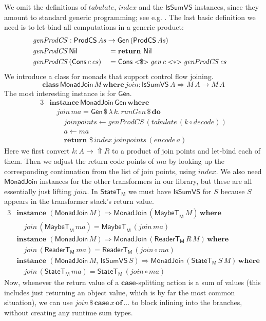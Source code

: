 \documentclass[acmsmall,screen,review,anonymous]{acmart}
\newcommand{\mit}[1]{\mathit{#1}}
\newcommand{\msf}[1]{\mathsf{#1}}
\newcommand{\mbf}[1]{\mathbf{#1}}
\newcommand{\mdo}{\mbf{do}\,}
\newcommand{\ind}{\hspace{1em}}
\newcommand{\return}{\mbf{return}\,}
\newcommand{\lam}{\lambda\,}
\newcommand{\where}{\mbf{where}}
\newcommand{\M}{\msf{M}}
\newcommand{\of}{\mbf{of}\,}
\newcommand{\vma}{\mit{ma}}
\newcommand{\Nil}{\msf{Nil}}
\newcommand{\Cons}{\msf{Cons}}
\newcommand{\ReaderT}{\msf{ReaderT}}
\newcommand{\fro}{\leftarrow}
\newcommand{\case}{\mbf{case\,}}
\newcommand{\Lift}{{\Uparrow}}
\newcommand{\MaybeT}{\msf{MaybeT}}
\theoremstyle{remark}
\newcommand{\tyclass}{\mbf{class}}
\newcommand{\instance}{\mbf{instance}\,}
\newcommand{\Gen}{\msf{Gen}}
\newcommand{\gen}{\mit{gen}}
\newcommand{\fmap}{<\!\!\$\!\!>}
\newcommand{\ap}{<\!\!*\!\!>}
\newcommand{\runGen}{\mit{runGen}}
\newcommand{\RA}{\Rightarrow}
\newcommand{\StateT}{\msf{StateT}}
\newcommand{\dlr}{\,\$\,}
\newcommand{\ProdCS}{\msf{ProdCS}}
\newcommand{\IsSumVS}{\msf{IsSumVS}}
\newcommand{\MonadJoin}{\msf{MonadJoin}}
\newcommand{\join}{\mit{join}}
\newcommand{\mAs}{\mit{As}}
\newcommand{\encode}{\mit{encode}}
\newcommand{\decode}{\mit{decode}}
\newcommand{\mindex}{\mit{index}}
\newcommand{\mtabulate}{\mit{tabulate}}
\begin{document}
We omit the definitions of $\mtabulate$, $\mindex$ and the $\IsSumVS$ instances,
since they amount to standard generic programming; see e.g. \cite{TODO}. The
last basic definition we need is to let-bind all computations in a generic
product:
\begin{alignat*}{3}
  & \mathrlap{\mit{genProdCS} : \ProdCS\,\mAs \to \Gen\,(\ProdCS\,\mAs)}\\
  & \mit{genProdCS}\,\Nil                 &&= \return\,\Nil\\
  & \mit{genProdCS}\,(\Cons\,c\,\mit{cs}) &&= \Cons \fmap \gen\,c \ap \mit{genProdCS}\,\mit{cs}
\end{alignat*}
We introduce a class for monads that support control flow joining.
\[ \tyclass\,\MonadJoin\,M\,\where\,\join : \IsSumVS\,A \RA M\,A \to M\,A \]
The most interesting instance is for $\Gen$.
\begin{alignat*}{3}
  &\instance \MonadJoin\,\Gen\,\where\\
  &\ind \join\,\vma = \Gen \dlr \lam k.\,\runGen \dlr \mdo\\
  &\ind \ind \mit{joinpoints} \fro \mit{genProdCS}\,(\mtabulate\,(k \circ \decode))\\
  &\ind \ind a \fro \vma\\
  &\ind \ind \return \dlr \mindex\,\mit{joinpoints}\,(\encode\,a)
\end{alignat*}
Here we first convert $k : A \to \Lift R$ to a product of join points and
let-bind each of them. Then we adjust the return code points of $\vma$ by
looking up the corresponding continuation from the list of join points, using
$\mindex$. We also need $\MonadJoin$ instances for the other transformers in our
library, but these are all essentially just lifting $\join$. In $\StateT_\M$ we
must have $\IsSumVS$ for $S$ because $S$ appears in the transformer stack's
return value.
\begin{alignat*}{3}
  & \instance\,(\MonadJoin\,M) \RA \MonadJoin\,(\MaybeT_\M\,M)\,\where\\
  & \ind \join\,(\MaybeT_\M\,\vma) = \MaybeT_\M\,(\join\,\vma)\\
  & \instance\,(\MonadJoin\,M) \RA \MonadJoin\,(\ReaderT_\M\,R\,M)\,\where\\
  & \ind \join\,(\ReaderT_\M\,\vma) = \ReaderT_\M\,(\join \circ \vma)\\
  & \instance\,(\MonadJoin\,M,\,\IsSumVS\,S) \RA \MonadJoin\,(\StateT_\M\,S\,M)\,\where\\
  & \ind \join\,(\StateT_\M\,\vma) = \StateT_\M\,(\join \circ \vma)
\end{alignat*}
Now, whenever the return value of a $\mbf{case}$-splitting action is a sum of
values (this includes just returning an object value, which is by far the most
common situation), we can use $\join \dlr \case x\,\of ...$ to block inlining
into the branches, without creating any runtime sum types.
\end{document}
